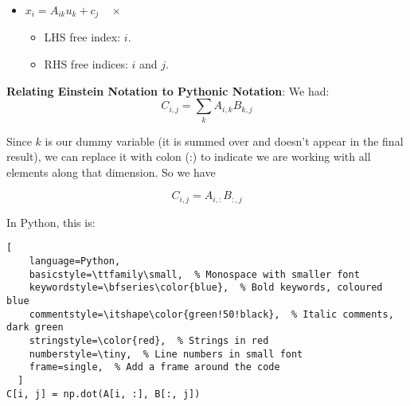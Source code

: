 \begin{enumerate}[label=\textbf{Rule \arabic*}:, leftmargin=*, labelsep=1em]
\begin{itemize}
              \item $x_i = A_{ik}u_k + c_j \quad \times$
                    \begin{itemize}
                        \item LHS free index: $i$.
                        \item RHS free indices: $i$ and $j$.
                    \end{itemize}
          \end{itemize}
\end{enumerate}


\textbf{Relating Einstein Notation to Pythonic Notation}:
We had:
\begin{equation}
    C_{i,j} = \sum_k A_{i,k}B_{k,j}
\end{equation}

Since $k$ is our dummy variable (it is summed over and doesn't appear in the final result), we can replace it with colon (:) to indicate we are working with all elements along that dimension. So we have

\begin{equation}
    C_{i,j} = A_{i,:}B_{:,j}
\end{equation}

In Python, this is:
\begin{lstlisting}[
    language=Python,
    basicstyle=\ttfamily\small,  % Monospace with smaller font
    keywordstyle=\bfseries\color{blue},  % Bold keywords, coloured blue
    commentstyle=\itshape\color{green!50!black},  % Italic comments, dark green
    stringstyle=\color{red},  % Strings in red
    numberstyle=\tiny,  % Line numbers in small font
    frame=single,  % Add a frame around the code
  ]
C[i, j] = np.dot(A[i, :], B[:, j])
\end{lstlisting}



